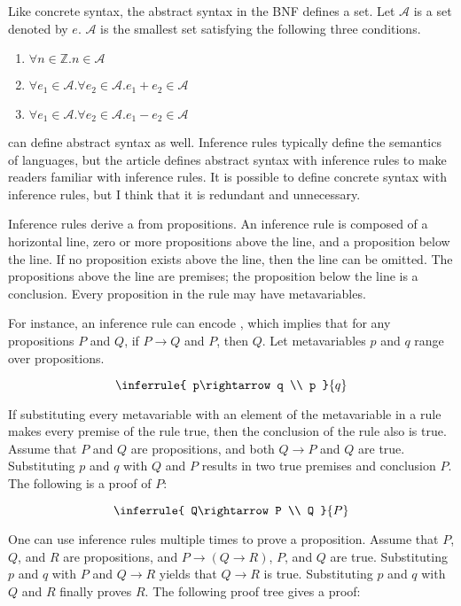 Like concrete syntax, the abstract syntax in the BNF defines a set. Let
\(\mathcal{A}\) is a set denoted by \(e\). \(\mathcal{A}\) is the smallest set
satisfying the following three conditions.

\begin{enumerate}
\item \(\forall n\in\mathbb{Z}.n\in \mathcal{A}\)
\item \(\forall e_1\in\mathcal{A}.\forall e_2\in\mathcal{A}.e_1+e_2\in\mathcal{A}\)
\item \(\forall e_1\in\mathcal{A}.\forall e_2\in\mathcal{A}.e_1-e_2\in\mathcal{A}\)
\end{enumerate}

 can define abstract syntax as well. Inference rules
typically define the semantics of languages, but the article defines abstract
syntax with inference rules to make readers familiar with inference rules. It is
possible to define concrete syntax with inference rules, but I think that it is
redundant and unnecessary.

Inference rules derive a  from propositions. An inference rule
is composed of a horizontal line, zero or more propositions above the line, and a
proposition below the line. If no proposition exists above the line, then the
line can be omitted. The propositions above the line are premises; the
proposition below the line is a conclusion. Every proposition in the rule may
have metavariables.

For instance, an inference rule can encode , which implies
that for any propositions \(P\) and \(Q\), if \(P\rightarrow Q\) and \(P\), then
\(Q\). Let metavariables \(p\) and \(q\) range over propositions.

\[
\inferrule
{ p\rightarrow q \\ p }
{ q }
\]

If substituting every metavariable with an element of the metavariable in a rule
makes every premise of the rule true, then the conclusion of the rule also is
true. Assume that \(P\) and \(Q\) are propositions, and both \(Q\rightarrow P\)
and \(Q\) are true. Substituting \(p\) and \(q\) with \(Q\) and \(P\) results in
two true premises and conclusion \(P\). The following  is a
proof of \(P\):

\[
\inferrule
{ Q\rightarrow P \\ Q }
{ P }
\]

One can use inference rules multiple times to prove a proposition. Assume that
\(P\), \(Q\), and \(R\) are propositions, and \(P\rightarrow(Q\rightarrow R)\),
\(P\), and \(Q\) are true. Substituting \(p\) and \(q\) with \(P\) and
\(Q\rightarrow R\) yields that \(Q\rightarrow R\) is true. Substituting \(p\) and
\(q\) with \(Q\) and \(R\) finally proves \(R\). The following proof tree gives a
proof:

